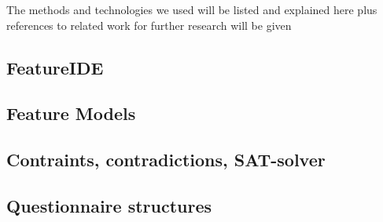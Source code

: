 The methods and technologies we used will be listed and explained here plus references to related work for further research will be given

\subsection{FeatureIDE}

\subsection{Feature Models}

\subsection{Contraints, contradictions, SAT-solver}

\subsection{Questionnaire structures}


